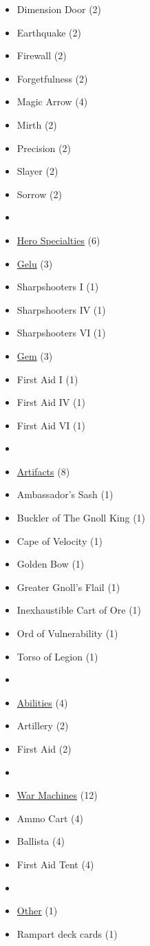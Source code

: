 \begin{multicols}{3}
\begin{itemize}[leftmargin=0pt, label={}, noitemsep, noitemsep]
  \item Dimension Door (2)
  \item Earthquake (2)
  \item Firewall (2)
  \item Forgetfulness (2)
  \item Magic Arrow (4)
  \item Mirth (2)
  \item Precision (2)
  \item Slayer (2)
  \item Sorrow (2)
  \item
  \item \underline{Hero Specialties} (6)
  \item \underline{Gelu} (3)
  \item Sharpshooters I (1)
  \item Sharpshooters IV (1)
  \item Sharpshooters VI (1)
  \item \underline{Gem} (3)
  \item First Aid I (1)
  \item First Aid IV (1)
  \item First Aid VI (1)
  \item
  \item \underline{Artifacts} (8)
  \item Ambassador's Sash (1)
  \item Buckler of The Gnoll King (1)
  \item Cape of Velocity (1)
  \item Golden Bow (1)
  \item Greater Gnoll's Flail (1)
  \item Inexhaustible Cart of Ore (1)
  \item Ord of Vulnerability (1)
  \item Torso of Legion (1)
  \item
  \item \underline{Abilities} (4)
  \item Artillery (2)
  \item First Aid (2)
  \item
  \item \underline{War Machines} (12)
  \item Ammo Cart (4)
  \item Ballista (4)
  \item First Aid Tent (4)
  \item
  \item \underline{Other} (1)
  \item Rampart deck cards (1)
\end{itemize}

\end{multicols}
